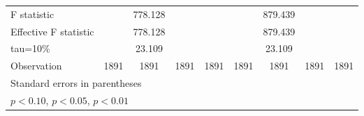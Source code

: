 \begin{tabular}{l*{8}{c}}
\hline
F statistic         &                     &     778.128         &                     &                     &                     &     879.439         &                     &                     \\
Effective F statistic&                     &     778.128         &                     &                     &                     &     879.439         &                     &                     \\
tau=10\%            &                     &      23.109         &                     &                     &                     &      23.109         &                     &                     \\
Observation         &        1891         &        1891         &        1891         &        1891         &        1891         &        1891         &        1891         &        1891         \\
\bottomrule \multicolumn{9}{l}{\footnotesize Standard errors in parentheses}\\ \multicolumn{8}{l}{\footnotesize \sym{*} \(p<0.10\), \sym{**} \(p<0.05\), \sym{***} \(p<0.01\)} \end{tabular}
